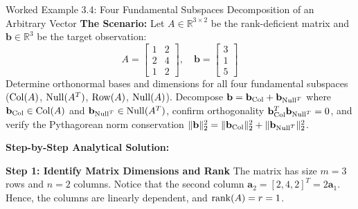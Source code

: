 \begin{examplebox}{Worked Example 3.4: Four Fundamental Subspaces Decomposition of an Arbitrary Vector}
\label{ex:w03_four_subspaces_decomp}
\textbf{The Scenario:}
Let $A \in \mathbb{R}^{3 \times 2}$ be the rank-deficient matrix and $\mathbf{b} \in \mathbb{R}^3$ be the target observation:
\begin{equation*}
A = \begin{bmatrix} 1 & 2 \\ 2 & 4 \\ 1 & 2 \end{bmatrix}, \quad \mathbf{b} = \begin{bmatrix} 3 \\ 1 \\ 5 \end{bmatrix}
\end{equation*}
Determine orthonormal bases and dimensions for all four fundamental subspaces ($\operatorname{Col}(A)$, $\operatorname{Null}(A^T)$, $\operatorname{Row}(A)$, $\operatorname{Null}(A)$). Decompose $\mathbf{b} = \mathbf{b}_{\operatorname{Col}} + \mathbf{b}_{\operatorname{Null}^T}$ where $\mathbf{b}_{\operatorname{Col}} \in \operatorname{Col}(A)$ and $\mathbf{b}_{\operatorname{Null}^T} \in \operatorname{Null}(A^T)$, confirm orthogonality $\mathbf{b}_{\operatorname{Col}}^T \mathbf{b}_{\operatorname{Null}^T} = 0$, and verify the Pythagorean norm conservation $\|\mathbf{b}\|_2^2 = \|\mathbf{b}_{\operatorname{Col}}\|_2^2 + \|\mathbf{b}_{\operatorname{Null}^T}\|_2^2$.

\tcblower
\textbf{Step-by-Step Analytical Solution:}

\textbf{Step 1: Identify Matrix Dimensions and Rank}
The matrix has size $m = 3$ rows and $n = 2$ columns.
Notice that the second column $\mathbf{a}_2 = [2, 4, 2]^T = 2 \mathbf{a}_1$.
Hence, the columns are linearly dependent, and $\operatorname{rank}(A) = r = 1$.


\end{examplebox}
